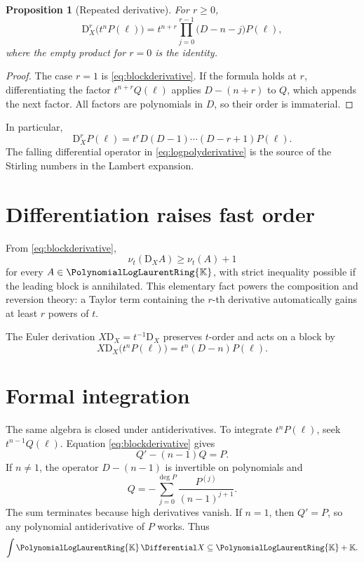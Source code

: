 \documentclass[11pt,oneside,openany]{book}
\newtheorem{proposition}[theorem]{Proposition}
\newcommand{\K}{\mathbb{K}}
\newcommand{\Pring}{\PolynomialLogLaurentRing{\K}}
\newcommand{\ordt}{\nu_t}
\newcommand{\D}{\mathrm{D}}
\begin{document}
\begin{proposition}[Repeated derivative]\label{prop:repeatedD}
For \(r\geq0\),
\begin{equation}\label{eq:repeatedD}
  \D_X^r\bigl(t^nP(\ell)\bigr)
  =t^{n+r}
    \prod_{j=0}^{r-1}\bigl(D-n-j\bigr)P(\ell),
\end{equation}
where the empty product for \(r=0\) is the identity.
\end{proposition}

\begin{proof}
The case \(r=1\) is \cref{eq:blockderivative}.  If the formula holds at
\(r\), differentiating the factor
\(t^{n+r}Q(\ell)\) applies \(D-(n+r)\) to \(Q\), which appends the next factor.
All factors are polynomials in \(D\), so their order is immaterial.
\end{proof}

In particular,
\begin{equation}\label{eq:logpolyderivative}
  \D_X^r P(\ell)
  =t^r D(D-1)\cdots(D-r+1)P(\ell).
\end{equation}
The falling differential operator in \cref{eq:logpolyderivative} is the source
of the Stirling numbers in the Lambert expansion.

\section{Differentiation raises fast order}
From \cref{eq:blockderivative},
\begin{equation}\label{eq:Dvaluation}
  \ordt(\D_XA)\geq\ordt(A)+1
\end{equation}
for every \(A\in\Pring\), with strict inequality possible if the leading block
is annihilated.  This elementary fact powers the composition and reversion
theory: a Taylor term containing the \(r\)-th derivative automatically gains at
least \(r\) powers of \(t\).

The Euler derivation \(X\D_X=t^{-1}\D_X\) preserves \(t\)-order and acts on a
block by
\begin{equation}\label{eq:Euler}
  X\D_X\bigl(t^nP(\ell)\bigr)
  =t^n(D-n)P(\ell).
\end{equation}

\section{Formal integration}
The same algebra is closed under antiderivatives.  To integrate
\(t^nP(\ell)\), seek \(t^{n-1}Q(\ell)\).  Equation
\cref{eq:blockderivative} gives
\begin{equation}\label{eq:integrateODE}
  Q'-(n-1)Q=P.
\end{equation}
If \(n\neq1\), the operator \(D-(n-1)\) is invertible on polynomials and
\begin{equation}\label{eq:integrateformula}
  Q=-\sum_{j=0}^{\deg P}\frac{P^{(j)}}{(n-1)^{j+1}}.
\end{equation}
The sum terminates because high derivatives vanish.  If \(n=1\), then
\(Q'=P\), so any polynomial antiderivative of \(P\) works.  Thus
\begin{equation}\label{eq:integrationclosed}
  \int \Pring\,\Differential X\subseteq\Pring+\K.
\end{equation}
\end{document}
